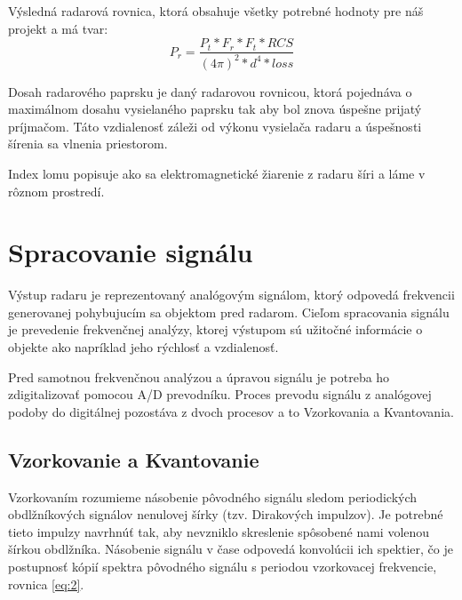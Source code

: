     Výsledná radarová rovnica, ktorá obsahuje všetky potrebné hodnoty pre náš projekt a má tvar:
    \begin{equation} %
      P_{r} = \frac{P_{t} * F_{r} * F_{t} * RCS}{(4\pi)^{2} * d^{4} * loss}
    \end{equation}

    \hspace{0.6cm}Dosah radarového paprsku je daný radarovou rovnicou, ktorá pojednáva o maximálnom dosahu vysielaného paprsku tak aby bol znova úspešne prijatý príjmačom. Táto vzdialenosť záleži od výkonu vysielača radaru a úspešnosti šírenia sa vlnenia priestorom.

    Index lomu popisuje ako sa elektromagnetické žiarenie z radaru šíri a láme v rôznom prostredí\cite{radarbeam}.
        
\section{Spracovanie signálu}
    \hspace{0.6cm}Výstup radaru je reprezentovaný analógovým signálom, ktorý odpovedá frekvencii generovanej pohybujucím sa objektom pred radarom. Cieľom spracovania signálu je prevedenie frekvenčnej analýzy, ktorej výstupom sú užitočné informácie o objekte ako napríklad jeho rýchlosť a vzdialenosť.

    Pred samotnou frekvenčnou analýzou a úpravou signálu je potreba ho zdigitalizovať pomocou A/D prevodníku. Proces prevodu signálu z analógovej podoby do digitálnej pozostáva z dvoch procesov a to Vzorkovania a Kvantovania\cite{radarsystemproc}.\newline

  \subsection{Vzorkovanie a Kvantovanie}

    \hspace{0.6cm}Vzorkovaním rozumieme násobenie pôvodného signálu sledom periodických obdlžníkových signálov nenulovej šírky (tzv. Dirakových impulzov). Je potrebné tieto impulzy navrhnúť tak, aby nevzniklo skreslenie spôsobené nami volenou šírkou obdlžníka.
    Násobenie signálu v čase odpovedá konvolúcii ich spektier, čo je postupnosť kópií spektra pôvodného signálu s periodou vzorkovacej frekvencie, rovnica \ref{eq:2}\cite{issslajdy}.

